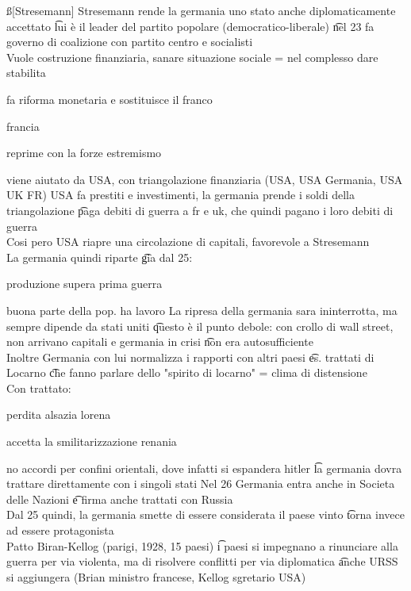 \documentclass[12pt]{article}
\begin{document}
\ss[Stresemann]
Stresemann rende la germania uno stato anche diplomaticamente accettato \t lui è il leader del partito popolare (democratico-liberale) \t nel 23 fa governo di coalizione con partito centro e socialisti \\
Vuole costruzione finanziaria, sanare situazione sociale = nel complesso dare stabilita
\bi
  \item fa riforma monetaria e sostituisce il franco
  \item francia
  \item reprime con la forze estremismo
  \item viene aiutato da USA, con triangolazione finanziaria (USA, USA Germania, USA UK FR)
\ei
USA fa prestiti e investimenti, la germania prende i soldi della triangolazione \t paga debiti di guerra a fr e uk, che quindi pagano i loro debiti di guerra \\
Cosi pero USA riapre una circolazione di capitali, favorevole a Stresemann \\
La germania quindi riparte \t gia dal 25:
\bi
  \item produzione supera prima guerra
  \item buona parte della pop. ha lavoro
\ei
La ripresa della germania sara ininterrotta, ma sempre dipende da stati uniti \t questo è il punto debole: con crollo di wall street, non arrivano capitali e germania in crisi \t non era autosufficiente \\
Inoltre Germania con lui normalizza i rapporti con altri paesi \t es. trattati di Locarno \t che fanno parlare dello "spirito di locarno" = clima di distensione \\
Con trattato:
\bi
  \item perdita alsazia lorena
  \item accetta la smilitarizzazione renania
  \item no accordi per confini orientali, dove infatti si espandera hitler \t la germania dovra trattare direttamente con i singoli stati
\ei
Nel 26 Germania entra anche in Societa delle Nazioni \t e firma anche trattati con Russia \\
Dal 25 quindi, la germania smette di essere considerata il paese vinto \t torna invece ad essere protagonista \\
Patto Biran-Kellog (parigi, 1928, 15 paesi) \t i paesi si impegnano a rinunciare alla guerra per via violenta, ma di risolvere conflitti per via diplomatica \t anche URSS si aggiungera (Brian ministro francese, Kellog sgretario USA) \\
\end{document}
